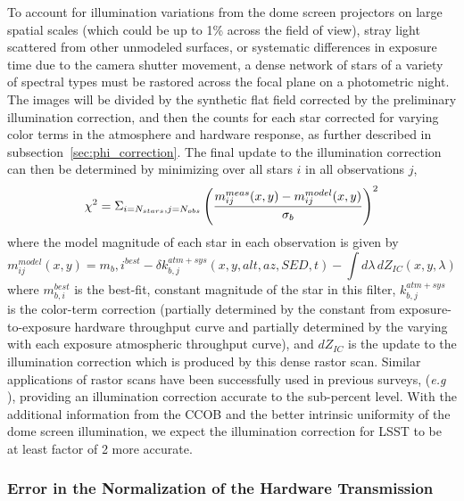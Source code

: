 \documentclass[12pt,preprint]{aastex}
\begin{document}
To account for illumination variations from the dome screen projectors
on large spatial scales (which could be up to 1\% across the field of
view), stray light scattered from other unmodeled surfaces, or systematic
differences in exposure time due to the camera shutter movement,  a dense
network of stars of a variety of spectral types must be rastored
across the focal plane on a photometric night. The images will be
divided by the synthetic flat field corrected by the preliminary
illumination correction, and then the counts for each star corrected
for varying color terms in the atmosphere and hardware response, as
further described in subsection~\ref{sec:phi_correction}.  The final
update to the illumination correction can then be determined by
minimizing over all stars $i$ in all observations $j$,
\begin{equation}
 \chi^2 =  \Sigma_{i=N_{stars},j=N_{obs}} \left( { m_{ij}^{meas}(x,y) - m_{ij}^{model}(x,y)
\over \sigma_b} \right)^2  
\end{equation}
where the model magnitude of each star in each observation is given by
\begin{equation}
m_{ij}^{model}(x,y) =  m_b,i^{best} - \delta k_{b,j}^{atm+sys}(x,y,alt,az,SED,t) - \int d\lambda \, dZ_{IC}(x,y,\lambda)
\end{equation}
where $m_{b,i}^{best}$ is the best-fit, constant magnitude of the star
in this filter, $k_{b,j}^{atm+sys}$ is the color-term correction
(partially determined by the constant from exposure-to-exposure
hardware throughput curve and partially determined by the varying with
each exposure atmospheric throughput curve), and $dZ_{IC}$ is the
update to the illumination correction which is produced by this dense
rastor scan. Similar applications of rastor scans have been
successfully used in previous surveys, ({\it e.g} \citet{Regnault2009,
Magnier2004, Manfroid1996}), providing an illumination correction
accurate to the sub-percent level. With the additional information
from the CCOB and the better intrinsic uniformity of the dome screen
illumination, we expect the illumination correction for LSST to be at
least factor of 2 more accurate.

\subsubsection{Error in the Normalization of the Hardware Transmission}
\end{document}
